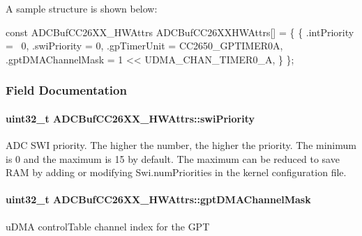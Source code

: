 A sample structure is shown below\+: 
\begin{DoxyCode}
\textcolor{keyword}{const} ADCBufCC26XX_HWAttrs ADCBufCC26XXHWAttrs[] = \{
    \{
        .intPriority = ~0,
        .swiPriority = 0,
        .gpTimerUnit = CC2650\_GPTIMER0A,
        .gptDMAChannelMask = 1 << UDMA\_CHAN\_TIMER0\_A,
    \}
\};
\end{DoxyCode}
 

\subsubsection{Field Documentation}
\paragraph[{swi\+Priority}]{\setlength{\rightskip}{0pt plus 5cm}uint32\+\_\+t A\+D\+C\+Buf\+C\+C26\+X\+X\+\_\+\+H\+W\+Attrs\+::swi\+Priority}\label{struct_a_d_c_buf_c_c26_x_x___h_w_attrs_a28c09f6a57b37133bd331c59f0b7e9c3}


A\+D\+C S\+W\+I priority. The higher the number, the higher the priority. The minimum is 0 and the maximum is 15 by default. The maximum can be reduced to save R\+A\+M by adding or modifying Swi.\+num\+Priorities in the kernel configuration file. 

\paragraph[{gpt\+D\+M\+A\+Channel\+Mask}]{\setlength{\rightskip}{0pt plus 5cm}uint32\+\_\+t A\+D\+C\+Buf\+C\+C26\+X\+X\+\_\+\+H\+W\+Attrs\+::gpt\+D\+M\+A\+Channel\+Mask}\label{struct_a_d_c_buf_c_c26_x_x___h_w_attrs_aa6cd006fc627af80afb01f4f65d9405f}
u\+D\+M\+A control\+Table channel index for the G\+P\+T 
